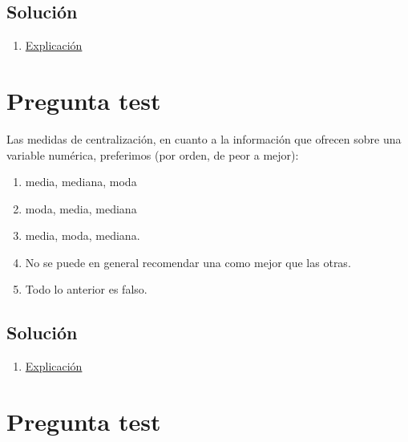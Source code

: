 \documentclass[
]{book}
\providecommand{\tightlist}{%
  \setlength{\itemsep}{0pt}\setlength{\parskip}{0pt}}
\begin{document}
\hypertarget{soluciuxf3n-41}{%
\subsection{Solución}\label{soluciuxf3n-41}}

\begin{enumerate}
\def\labelenumi{\alph{enumi})}
\setcounter{enumi}{3}
\tightlist
\item
  \href{https://1fjmanzano.github.io/bioestadistica/distribuciones-de-probabilidad.html\#distribucio\%CC\%81n-normal}{Explicación}
\end{enumerate}

\hypertarget{pregunta-test-40}{%
\section{Pregunta test}\label{pregunta-test-40}}

Las medidas de centralización, en cuanto a la información que ofrecen sobre una variable numérica, preferimos (por orden, de peor a mejor):

\begin{enumerate}
\def\labelenumi{\alph{enumi})}
\tightlist
\item
  media, mediana, moda
\item
  moda, media, mediana
\item
  media, moda, mediana.
\item
  No se puede en general recomendar una como mejor que las otras.
\item
  Todo lo anterior es falso.
\end{enumerate}

\hypertarget{soluciuxf3n-42}{%
\subsection{Solución}\label{soluciuxf3n-42}}

\begin{enumerate}
\def\labelenumi{\alph{enumi})}
\setcounter{enumi}{3}
\tightlist
\item
  \href{https://1fjmanzano.github.io/bioestadistica/medidas-de-posicio\%CC\%81n-dispersio\%CC\%81n-y-forma.html\#medidas-de-posicio\%CC\%81n-centrales}{Explicación}
\end{enumerate}

\hypertarget{pregunta-test-41}{%
\section{Pregunta test}\label{pregunta-test-41}}
\end{document}
